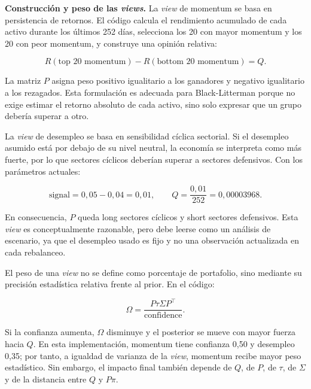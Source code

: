 \noindent\textbf{Construcci\'on y peso de las \textit{views}.}
La \textit{view} de momentum se basa en persistencia de retornos. El c\'odigo
calcula el rendimiento acumulado de cada activo durante los \'ultimos 252 d\'ias,
selecciona los 20 con mayor momentum y los 20 con peor momentum, y construye una
opini\'on relativa:

\begin{equation}
R(\text{top 20 momentum}) - R(\text{bottom 20 momentum}) = Q.
\end{equation}

La matriz $P$ asigna peso positivo igualitario a los ganadores y negativo
igualitario a los rezagados. Esta formulaci\'on es adecuada para Black-Litterman
porque no exige estimar el retorno absoluto de cada activo, sino solo expresar
que un grupo deber\'ia superar a otro.

La \textit{view} de desempleo se basa en sensibilidad c\'iclica sectorial. Si el
desempleo asumido est\'a por debajo de su nivel neutral, la econom\'ia se
interpreta como m\'as fuerte, por lo que sectores c\'iclicos deber\'ian superar a
sectores defensivos. Con los par\'ametros actuales:

\begin{equation}
\text{signal} = 0,05 - 0,04 = 0,01,
\qquad
Q = \frac{0,01}{252} = 0,00003968.
\end{equation}

En consecuencia, $P$ queda long sectores c\'iclicos y short sectores defensivos.
Esta \textit{view} es conceptualmente razonable, pero debe leerse como un
an\'alisis de escenario, ya que el desempleo usado es fijo y no una observaci\'on
actualizada en cada rebalanceo.

El peso de una \textit{view} no se define como porcentaje de portafolio, sino
mediante su precisi\'on estad\'istica relativa frente al prior. En el c\'odigo:

\begin{equation}
\Omega = \frac{P\tau\Sigma P^\top}{\text{confidence}}.
\end{equation}

Si la confianza aumenta, $\Omega$ disminuye y el posterior se mueve con mayor
fuerza hacia $Q$. En esta implementaci\'on, momentum tiene confianza 0,50 y
desempleo 0,35; por tanto, a igualdad de varianza de la \textit{view}, momentum
recibe mayor peso estad\'istico. Sin embargo, el impacto final tambi\'en depende
de $Q$, de $P$, de $\tau$, de $\Sigma$ y de la distancia entre $Q$ y $P\pi$.

